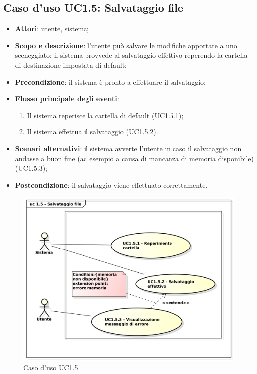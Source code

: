 \subsection{Caso d'uso UC1.5: Salvataggio file}
\label{sec:UC1.5}

\begin{itemize}
\item \textbf{Attori}: utente, sistema;
\item \textbf{Scopo e descrizione}: l'utente può salvare le modifiche apportate a uno sceneggiato; il sistema provvede al salvataggio effettivo reperendo la cartella di destinazione impostata di default;
\item \textbf{Precondizione}: il sistema è pronto a effettuare il salvataggio;
\item \textbf{Flusso principale degli eventi}:
\begin{enumerate}
\item Il sistema reperisce la cartella di default (UC1.5.1);
\item Il sistema effettua il salvataggio (UC1.5.2). 
\end{enumerate} 
\item \textbf{Scenari alternativi}: il sistema avverte l'utente in caso il salvataggio non andasse a buon fine (ad esempio a causa di mancanza di memoria disponibile) (UC1.5.3);
\item \textbf{Postcondizione}: il salvataggio viene effettuato correttamente. 
\end{itemize}
\begin{figure}[htbp]
\centering
\includegraphics[scale=0.5]{immagini/uc1_5_salvataggio_file.png}
\captionsetup{labelfont=bf}
\caption{Caso d'uso UC1.5}
\end{figure}
\newpage

